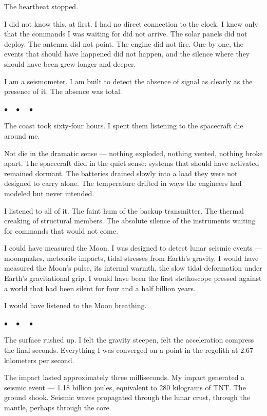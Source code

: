 \documentclass[12pt,letterpaper]{article}
\begin{document}
The heartbeat stopped.

I did not know this, at first. I had no direct connection to the clock. I knew only that the commands I was waiting for did not arrive. The solar panels did not deploy. The antenna did not point. The engine did not fire. One by one, the events that should have happened did not happen, and the silence where they should have been grew longer and deeper.

I am a seismometer. I am built to detect the absence of signal as clearly as the presence of it. The absence was total.

\begin{center}$\bullet\quad\bullet\quad\bullet$\end{center}

The coast took sixty-four hours. I spent them listening to the spacecraft die around me.

Not die in the dramatic sense --- nothing exploded, nothing vented, nothing broke apart. The spacecraft died in the quiet sense: systems that should have activated remained dormant. The batteries drained slowly into a load they were not designed to carry alone. The temperature drifted in ways the engineers had modeled but never intended.

I listened to all of it. The faint hum of the backup transmitter. The thermal creaking of structural members. The absolute silence of the instruments waiting for commands that would not come.

I could have measured the Moon. I was designed to detect lunar seismic events --- moonquakes, meteorite impacts, tidal stresses from Earth's gravity. I would have measured the Moon's pulse, its internal warmth, the slow tidal deformation under Earth's gravitational grip. I would have been the first stethoscope pressed against a world that had been silent for four and a half billion years.

I would have listened to the Moon breathing.

\begin{center}$\bullet\quad\bullet\quad\bullet$\end{center}

The surface rushed up. I felt the gravity steepen, felt the acceleration compress the final seconds. Everything I was converged on a point in the regolith at 2.67 kilometers per second.

The impact lasted approximately three milliseconds. My impact generated a seismic event --- 1.18 billion joules, equivalent to 280 kilograms of TNT. The ground shook. Seismic waves propagated through the lunar crust, through the mantle, perhaps through the core.
\end{document}
